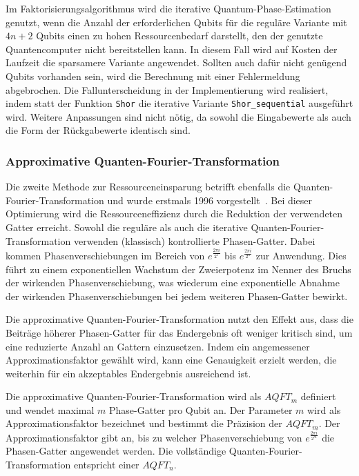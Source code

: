 \bigskip

Im Faktorisierungsalgorithmus wird die iterative Quantum-Phase-Estimation genutzt, 
wenn die Anzahl der erforderlichen Qubits für die reguläre Variante mit \(4n+2\) Qubits einen zu hohen Ressourcenbedarf darstellt, 
den der genutzte Quantencomputer nicht bereitstellen kann. 
In diesem Fall wird auf Kosten der Laufzeit die sparsamere Variante angewendet. 
Sollten auch dafür nicht genügend Qubits vorhanden sein, 
wird die Berechnung mit einer Fehlermeldung abgebrochen. 
Die Fallunterscheidung in der Implementierung wird realisiert, 
indem statt der Funktion \texttt{Shor} die iterative Variante \texttt{Shor\_sequential} ausgeführt wird. 
Weitere Anpassungen sind nicht nötig, 
da sowohl die Eingabewerte als auch die Form der Rückgabewerte identisch sind.

\subsubsection{Approximative Quanten-Fourier-Transformation} \label{sec:ApproxQFT}
Die zweite Methode zur Ressourceneinsparung betrifft ebenfalls die Quanten-Fourier-Transformation und 
wurde erstmals 1996 vorgestellt~\cite{Barenco_1996}.
Bei dieser Optimierung wird die Ressourceneffizienz durch die Reduktion der verwendeten Gatter erreicht. 
Sowohl die reguläre als auch die iterative Quanten-Fourier-Transformation verwenden (klassisch) kontrollierte Phasen-Gatter.
Dabei kommen Phasenverschiebungen im Bereich von \(e^{\frac{2\pi i}{2^1}}\) bis \(e^{\frac{2\pi i}{2^n}}\) zur Anwendung. 
Dies führt zu einem exponentiellen Wachstum der Zweierpotenz im Nenner des Bruchs der wirkenden Phasenverschiebung, 
was wiederum eine exponentielle Abnahme der wirkenden Phasenverschiebungen bei jedem weiteren Phasen-Gatter bewirkt. 

Die approximative Quanten-Fourier-Transformation nutzt den Effekt aus, 
dass die Beiträge höherer Phasen-Gatter für das Endergebnis oft weniger kritisch sind, 
um eine reduzierte Anzahl an Gattern einzusetzen. 
Indem ein angemessener Approximationsfaktor gewählt wird, 
kann eine Genauigkeit erzielt werden, 
die weiterhin für ein akzeptables Endergebnis ausreichend ist.

Die approximative Quanten-Fourier-Transformation wird als \(AQFT_m\) definiert und 
wendet maximal \(m\) Phase-Gatter pro Qubit an. 
Der Parameter \(m\) wird als Approximationsfaktor bezeichnet und bestimmt die Präzision der \(AQFT_m\). 
Der Approximationsfaktor gibt an, 
bis zu welcher Phasenverschiebung von \(e^{\frac{2\pi i}{2^m}}\) die Phasen-Gatter angewendet werden.
Die vollständige Quanten-Fourier-Transformation entspricht einer \(AQFT_n\).

